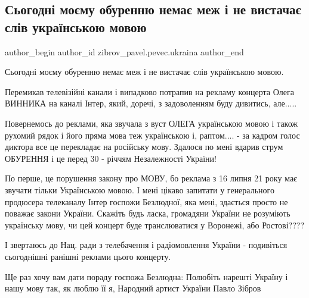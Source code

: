  
 
 
 
 
 
\subsection{Сьогодні моєму обуренню немає меж і не вистачає слів українською мовою}
\label{sec:01_08_2021.fb.zibrov_pavel.pevec.ukraina.1.kanal_inter_oleg_vinnik}
 
\ifcmt
 author_begin
   author_id zibrov_pavel.pevec.ukraina
 author_end
\fi

Сьогодні моєму обуренню немає меж і не вистачає слів українською мовою.

Перемикав телевізійні канали і випадково потрапив на рекламу концерта Олега
ВИННИКА на каналі Інтер, який, доречі, з задоволенням буду дивитись, але.....

Повернемось до реклами, яка звучала з вуст ОЛЕГА українською мовою і також
рухомий рядок і його пряма мова теж українською і, раптом.... - за кадром голос
диктора все це перекладає  на російську мову. Здалося  по мені вдарив струм
ОБУРЕННЯ і це перед 30 - річчям Незалежності України! 

По перше, це порушення закону про МОВУ, бо реклама з 16 липня 21 року має
звучати тільки Українською мовою. І мені цікаво запитати у генерального
продюсера телеканалу Інтер госпожи Безлюдної,  яка мені, здається просто не
поважає закони України. Скажіть будь ласка, громадяни України не розуміють
українську мову, чи цей концерт буде транслюватися у Воронежі, або Ростові????

І звертаюсь до Нац. ради з телебачення і радіомовлення України - подивіться
сьогоднішні ранішні реклами цього концерту.

Ще раз хочу вам дати пораду госпожа Безлюдна: Полюбіть нарешті Україну і нашу
мову так, як люблю її я, Народний артист України Павло Зібров

